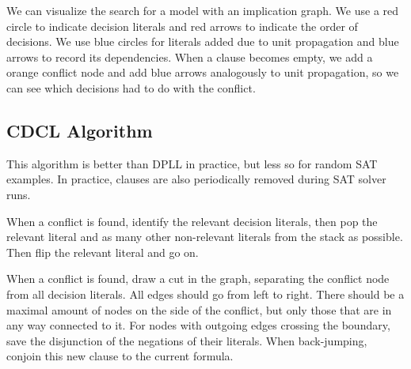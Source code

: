 \begin{mytitle} We can visualize the search for a model with an implication graph. We use a red circle to indicate decision literals and red arrows to indicate the order of decisions. We use blue circles for literals added due to unit propagation and blue arrows to record its dependencies. When a clause becomes empty, we add a orange conflict node and add blue arrows analogously to unit propagation, so we can see which decisions had to do with the conflict.
\end{mytitle}


\subsection{CDCL Algorithm}
\begin{mytitle} This algorithm is better than DPLL in practice, but less so for random SAT examples. In practice, clauses are also periodically removed during SAT solver runs.
    \begin{mysubtitle} When a conflict is found, identify the relevant decision literals, then pop the relevant literal and as many other non-relevant literals from the stack as possible. Then flip the relevant literal and go on.
    \end{mysubtitle}
    \begin{mysubtitle} When a conflict is found, draw a cut in the graph, separating the conflict node from all decision literals. All edges should go from left to right. There should be a maximal amount of nodes on the side of the conflict, but only those that are in any way connected to it. For nodes with outgoing edges crossing the boundary, save the disjunction of the negations of their literals. When back-jumping, conjoin this new clause to the current formula.
    \end{mysubtitle}
\end{mytitle}





